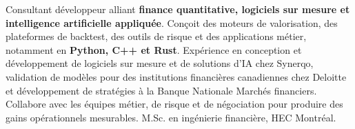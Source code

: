 
\begin{cvparagraph}

Consultant développeur alliant \textbf{finance quantitative, logiciels sur mesure et intelligence artificielle appliquée}. Conçoit des moteurs de valorisation, des plateformes de backtest, des outils de risque et des applications métier, notamment en \textbf{Python, C++ et Rust}. Expérience en conception et développement de logiciels sur mesure et de solutions d'IA chez Synerqo, validation de modèles pour des institutions financières canadiennes chez Deloitte et développement de stratégies à la Banque Nationale Marchés financiers. Collabore avec les équipes métier, de risque et de négociation pour produire des gains opérationnels mesurables. M.Sc. en ingénierie financière, HEC Montréal.

\end{cvparagraph}
